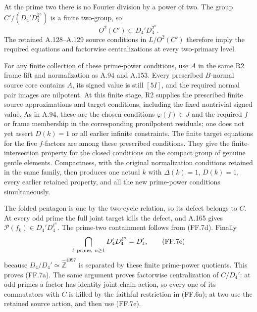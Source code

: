 At the prime two there is no Fourier division by a power
of two. The group
$C'/(D_4'D_4^{2^n})$ is a finite two-group, so
\[
                    O^2(C')\subset D_4'D_4^{2^n}.
 \tag{FF.7d}
\]
The retained A.128--A.129 source conditions in $L/O^2(C')$
therefore imply the required equations and factorwise
centralizations at every two-primary level.

For any finite collection of these prime-power conditions,
use $A$ in the same R2 frame lift and normalization as A.94
and A.153. Every prescribed $B$-normal source core contains
$A$, its signed value is still $[5I]$, and the required
normal pair images are nilpotent. At this finite stage,
R2 supplies the prescribed finite source approximations
and target conditions, including the fixed nontrivial
signed value. As in A.94, these are the chosen conditions
$\varphi(f)\in J$ and the required $f$ or frame membership
in the corresponding pronilpotent residuals; one does not
yet assert $D(k)=1$ or all earlier infinite constraints.
The finite target equations for the five $f$-factors are
among these prescribed conditions. They give the
finite-intersection property for the closed conditions
on the compact group of genuine gentle elements.
Compactness, with the original normalization conditions
retained in the same family, then produces one actual
$k$ with $\Delta(k)=1$, $D(k)=1$, every earlier retained
property, and all the new prime-power conditions
simultaneously.

The folded pentagon is one by the two-cycle relation, so
its defect belongs to $C$. At every odd prime the full
joint target kills the defect, and A.165 gives
$\mathcal P(f_k)\in D_4'D_4^{\ell^n}$. The prime-two
containment follows from (FF.7d). Finally
\[
             \bigcap_{\ell\ {\rm prime},\ n\geq1}
                    D_4'D_4^{\ell^n}=D_4',
 \tag{FF.7e}
\]
because $D_4/D_4'\simeq\widehat{\mathbb Z}^{4097}$ is
separated by these finite prime-power quotients. This proves
(FF.7a). The same argument proves factorwise centralization
of $C/D_4'$: at odd primes a factor has identity joint
chain action, so every one of its commutators with $C$ is
killed by the faithful restriction in (FF.6a); at two use
the retained source action, and then use (FF.7e).

